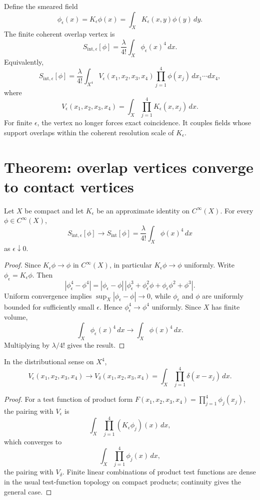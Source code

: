 \documentclass[11pt]{article}
\begin{document}
Define the smeared field
\[
\phi_\epsilon(x)=K_\epsilon\phi(x)
=\int_XK_\epsilon(x,y)\phi(y)\,dy .
\]
The finite coherent overlap vertex is
\[
S_{\mathrm{int},\epsilon}[\phi]
=
\frac{\lambda}{4!}\int_X \phi_\epsilon(x)^4\,dx .
\]
Equivalently,
\[
S_{\mathrm{int},\epsilon}[\phi]
=
\frac{\lambda}{4!}
\int_{X^4}
V_\epsilon(x_1,x_2,x_3,x_4)
\prod_{j=1}^4\phi(x_j)\,
dx_1\cdots dx_4,
\]
where
\[
V_\epsilon(x_1,x_2,x_3,x_4)
=
\int_X\prod_{j=1}^{4}K_\epsilon(x,x_j)\,dx .
\]
For finite \(\epsilon\), the vertex no longer forces exact coincidence.  It couples fields
whose support overlaps within the coherent resolution scale of \(K_\epsilon\).

\section{Theorem: overlap vertices converge to contact vertices}

\begin{theorem}
Let \(X\) be compact and let \(K_\epsilon\) be an approximate identity on \(C^\infty(X)\).
For every \(\phi\in C^\infty(X)\),
\[
S_{\mathrm{int},\epsilon}[\phi]\longrightarrow
S_{\mathrm{int}}[\phi]
=
\frac{\lambda}{4!}\int_X\phi(x)^4\,dx
\]
as \(\epsilon\downarrow0\).
\end{theorem}

\begin{proof}
Since \(K_\epsilon\phi\to\phi\) in \(C^\infty(X)\), in particular
\(K_\epsilon\phi\to\phi\) uniformly.  Write \(\phi_\epsilon=K_\epsilon\phi\).  Then
\[
|\phi_\epsilon^4-\phi^4|
=
|\phi_\epsilon-\phi|\,
|\phi_\epsilon^3+\phi_\epsilon^2\phi+\phi_\epsilon\phi^2+\phi^3|.
\]
Uniform convergence implies \(\sup_X|\phi_\epsilon-\phi|\to0\), while
\(\phi_\epsilon\) and \(\phi\) are uniformly bounded for sufficiently small \(\epsilon\).
Hence \(\phi_\epsilon^4\to\phi^4\) uniformly.  Since \(X\) has finite volume,
\[
\int_X \phi_\epsilon(x)^4\,dx \to \int_X\phi(x)^4\,dx .
\]
Multiplying by \(\lambda/4!\) gives the result.
\end{proof}

\begin{corollary}
In the distributional sense on \(X^4\),
\[
V_\epsilon(x_1,x_2,x_3,x_4)\to
V_\delta(x_1,x_2,x_3,x_4)
=
\int_X\prod_{j=1}^4\delta(x-x_j)\,dx .
\]
\end{corollary}

\begin{proof}
For a test function of product form
\(F(x_1,x_2,x_3,x_4)=\prod_{j=1}^4\phi_j(x_j)\), the pairing with \(V_\epsilon\) is
\[
\int_X\prod_{j=1}^4(K_\epsilon\phi_j)(x)\,dx,
\]
which converges to
\[
\int_X\prod_{j=1}^4\phi_j(x)\,dx,
\]
the pairing with \(V_\delta\).  Finite linear combinations of product test functions are
dense in the usual test-function topology on compact products; continuity gives the general
case.
\end{proof}
\end{document}
